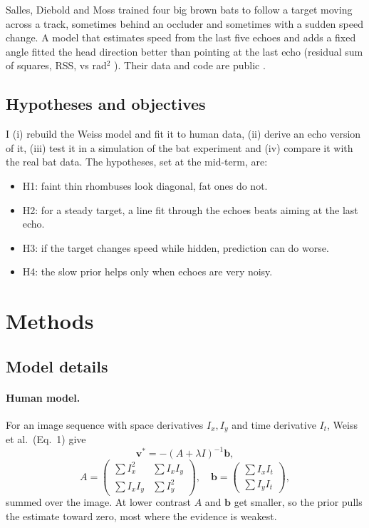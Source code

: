 \documentclass[11pt]{article}
\begin{document}
Salles, Diebold and Moss \cite{salles2020} trained four big brown bats to follow a target moving across a track, sometimes behind an occluder and sometimes with a sudden speed change. A model that estimates speed from the last five echoes and adds a fixed angle fitted the head direction better than pointing at the last echo (residual sum of squares, RSS, \paperRssPredictive{} vs \paperRssNonpredictive{} rad$^2$ \cite{salles2020si}). Their data and code are public \cite{sallesrepo}.

\subsection{Hypotheses and objectives}
I (i) rebuild the Weiss model and fit it to human data, (ii) derive an echo version of it, (iii) test it in a simulation of the bat experiment and (iv) compare it with the real bat data. The hypotheses, set at the mid-term, are:
\begin{itemize}[nosep]
\item H1: faint thin rhombuses look diagonal, fat ones do not.
\item H2: for a steady target, a line fit through the echoes beats aiming at the last echo.
\item H3: if the target changes speed while hidden, prediction can do worse.
\item H4: the slow prior helps only when echoes are very noisy.
\end{itemize}

\section{Methods}
\subsection{Model details}
\paragraph{Human model.} For an image sequence with space derivatives $I_x, I_y$ and time derivative $I_t$, Weiss et al.\ (Eq.~1) give
\begin{equation}
\mathbf{v}^* = -(A+\lambda I)^{-1}\mathbf{b},
\label{eq:weiss}
\end{equation}
\[
A=\begin{pmatrix}\sum I_x^2 & \sum I_xI_y\\ \sum I_xI_y & \sum I_y^2\end{pmatrix},\quad
\mathbf{b}=\begin{pmatrix}\sum I_xI_t\\ \sum I_yI_t\end{pmatrix},
\]
summed over the image. At lower contrast $A$ and $\mathbf{b}$ get smaller, so the prior pulls the estimate toward zero, most where the evidence is weakest.
\end{document}
